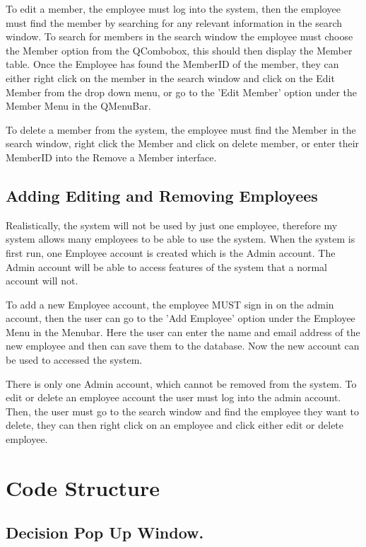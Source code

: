 To edit a member, the employee must log into the system, then the employee must find the member by searching for any relevant information in the search window. To search for members in the search window the employee must choose the Member option from the QCombobox, this should then display the Member table. Once the Employee has found the MemberID of the member, they can either right click on the member in the search window and click on the Edit Member from the drop down menu, or go to the 'Edit Member' option under the Member Menu in the QMenuBar. 

To delete a member from the system, the employee must find the Member in the search window, right click the Member and click on delete member, or enter their MemberID into the Remove a Member interface.

\subsection{Adding Editing and Removing Employees}
Realistically, the system will not be used by just one employee, therefore my system allows many employees to be able to use the system. When the system is first run, one Employee account is created which is the Admin account. The Admin account will be able to access features of the system that a normal account will not. 

To add a new Employee account, the employee MUST sign in on the admin account, then the user can go to the 'Add Employee' option under the Employee Menu in the Menubar. Here the user can enter the name and email address of the new employee and then can save them to the database. Now the new account can be used to accessed the system.

There is only one Admin account, which cannot be removed from the system.
To edit or delete an employee account the user must log into the admin account. Then, the user must go to the search window and find the employee they want to delete, they can then right click on an employee and click either edit or delete employee.


\section{Code Structure}


\subsection{Decision Pop Up Window.}
\begin{figure}[H]
\end{figure}

